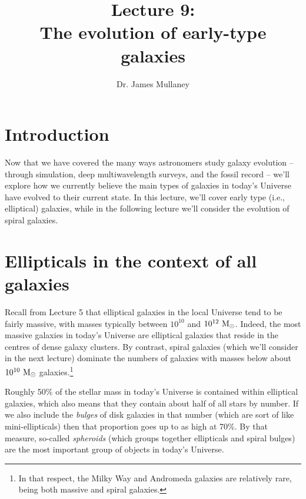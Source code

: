\documentclass[11pt]{article}
\begin{document}
 
\title{Lecture 9:\\The evolution of early-type galaxies}
\author{Dr. James Mullaney}
\maketitle

\section{Introduction}
Now that we have covered the many ways astronomers study galaxy
evolution -- through simulation, deep multiwavelength surveys, and the
fossil record -- we'll explore how we currently believe the main types
of galaxies in today's Universe have evolved to their current
state. In this lecture, we'll cover early type (i.e., elliptical)
galaxies, while in the following lecture we'll consider the evolution
of spiral galaxies.

\section{Ellipticals in the context of all galaxies}
Recall from Lecture 5 that elliptical galaxies in the local Universe
tend to be fairly massive, with masses typically between $10^{10}$ and
$10^{12}~{\rm M_\odot}$. Indeed, the most massive galaxies in today's
Universe are elliptical galaxies that reside in the centres of dense
galaxy clusters. By contrast, spiral galaxies (which we'll consider in
the next lecture) dominate the numbers of galaxies with masses below
about ${\rm 10^{10}~M_\odot}$ galaxies.\footnote{In that respect, the
  Milky Way and Andromeda galaxies are relatively rare, being both
  massive and spiral galaxies.}

Roughly 50\% of the stellar mass in today's Universe is contained
within elliptical galaxies, which also means that they contain about
half of all stars by number. If we also include the {\it bulges} of
disk galaxies in that number (which are sort of like mini-ellipticals)
then that proportion goes up to as high at 70\%. By that measure,
so-called {\it spheroids} (which groups together ellipticals and
spiral bulges) are the most important group of objects in today's
Universe.
\end{document}
